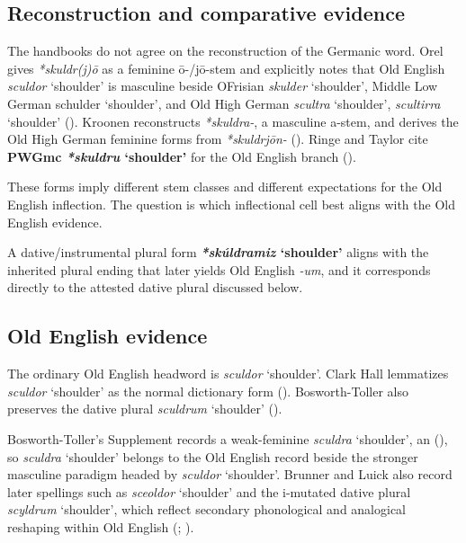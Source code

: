 \documentclass[
  british,
  a4paper,
  openany]{book}
\providecommand{\Recon}[1]{\emph{*#1}}
{\catcode`→=\active \global\def→{\ensuremath{\rightarrow}}}
\providecommand{\Recon}[1]{\emph{*#1}}
{\catcode`→=\active \global\def→{\ensuremath{\rightarrow}}}
\begin{document}
\subsection{Reconstruction and comparative
evidence}\label{reconstruction-and-comparative-evidence-122}

The handbooks do not agree on the reconstruction of the Germanic word.
Orel gives \emph{*skuldr(j)ō} as a feminine ō-/jō-stem and explicitly
notes that Old English {\emph{sculdor}} `shoulder' is masculine beside
OFrisian {\emph{skulder}} `shoulder', Middle Low German {schulder}
`shoulder', and Old High German {\emph{scultra}} `shoulder',
{\emph{scultirra}} `shoulder' ().
Kroonen reconstructs {\emph{*skuldra-}}, a masculine a-stem, and derives
the Old High German feminine forms from {\emph{*skuldrjōn-}}
(). Ringe and Taylor cite
\textbf{PWGmc {\Recon{skuldru} `shoulder'}} for the Old English branch
().

These forms imply different stem classes and different expectations for
the Old English inflection. The question is which inflectional cell best
aligns with the Old English evidence.

A dative/instrumental plural form \textbf{{\Recon{skúldramiz}
`shoulder'}} aligns with the inherited plural ending that later yields
Old English \emph{-um}, and it corresponds directly to the attested
dative plural discussed below.

\subsection{Old English evidence}\label{old-english-evidence-122}

The ordinary Old English headword is {\emph{sculdor}} `shoulder'. Clark
Hall lemmatizes {\emph{sculdor}} `shoulder' as the normal dictionary
form ().
Bosworth-Toller also preserves the dative plural {\emph{sculdrum}}
`shoulder' ().

Bosworth-Toller's Supplement records a weak-feminine {\emph{sculdra}}
`shoulder', an (), so {\emph{sculdra}} `shoulder' belongs to the Old English
record beside the stronger masculine paradigm headed by {\emph{sculdor}}
`shoulder'. Brunner and Luick also record later spellings such as
{\emph{sceoldor}} `shoulder' and the i-mutated dative plural
{\emph{scyldrum}} `shoulder', which reflect secondary phonological and
analogical reshaping within Old English
(;
).
\end{document}
